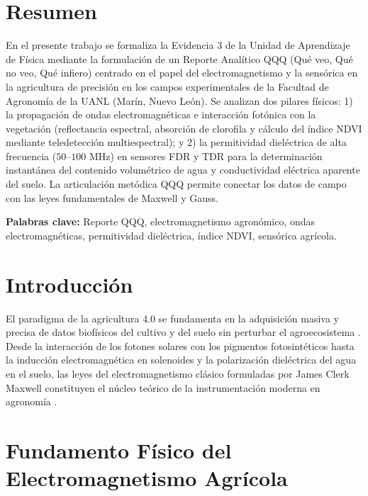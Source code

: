 \documentclass[12pt,spanish,letterpaper,oneside]{article}
\begin{document}
\hypersetup{pageanchor=false}
\begingroup
\fontsize{14}{17}\selectfont
\renewcommand{\Huge}{\fontsize{14}{17}\selectfont\bfseries}
\renewcommand{\large}{\fontsize{14}{17}\selectfont}
\templatePortrait
\clearpage
\endgroup
\hypersetup{pageanchor=true}
\templatePagecfg
\singlespacing
\setlength{\tabcolsep}{8pt}
\renewcommand{\arraystretch}{1.18}

\section*{Resumen}
En el presente trabajo se formaliza la Evidencia 3 de la Unidad de Aprendizaje de Física mediante la formulación de un Reporte Analítico QQQ (Qué veo, Qué no veo, Qué infiero) centrado en el papel del electromagnetismo y la sensórica en la agricultura de precisión en los campos experimentales de la Facultad de Agronomía de la UANL (Marín, Nuevo León). Se analizan dos pilares físicos: 1) la propagación de ondas electromagnéticas e interacción fotónica con la vegetación (reflectancia espectral, absorción de clorofila y cálculo del índice NDVI mediante teledetección multiespectral); y 2) la permitividad dieléctrica de alta frecuencia ($50\text{--}100\text{ MHz}$) en sensores FDR y TDR para la determinación instantánea del contenido volumétrico de agua y conductividad eléctrica aparente del suelo. La articulación metódica QQQ permite conectar los datos de campo con las leyes fundamentales de Maxwell y Gauss.

\vspace{0.4cm}
\noindent\textbf{Palabras clave:} Reporte QQQ, electromagnetismo agronómico, ondas electromagnéticas, permitividad dieléctrica, índice NDVI, sensórica agrícola.

\section{Introducción}
El paradigma de la agricultura 4.0 se fundamenta en la adquisición masiva y precisa de datos biofísicos del cultivo y del suelo sin perturbar el agroecosistema \parencite{giancoli2008}. Desde la interacción de los fotones solares con los pigmentos fotosintéticos hasta la inducción electromagnética en solenoides y la polarización dieléctrica del agua en el suelo, las leyes del electromagnetismo clásico formuladas por James Clerk Maxwell constituyen el núcleo teórico de la instrumentación moderna en agronomía \parencite{serway2018,tipler2010}.

\section{Fundamento Físico del Electromagnetismo Agrícola}
\end{document}
